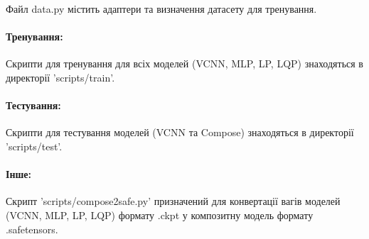 \documentclass{udstu}
\begin{document}
Файл data.py містить адаптери та визначення датасету для тренування.


\paragraph{\textbf{Тренування:}\\}

Скрипти для тренування для всіх моделей (VCNN, MLP, LP, LQP) знаходяться в директорії
'scripts/train'.


\paragraph{\textbf{Тестування:}\\}

Скрипти для тестування моделей (VCNN та Compose) знаходяться в директорії
'scripts/test'.


\paragraph{\textbf{Інше:}\\}

Скрипт 'scripts/compose2safe.py' призначений для конвертації вагів моделей (VCNN, MLP, LP, LQP)
формату .ckpt у композитну модель формату .safetensors.
\end{document}

